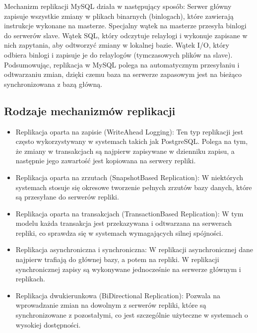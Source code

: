 \documentclass[a4paper,11pt,polish]{sphinxmanual}
\begin{document}
\sphinxAtStartPar
Mechanizm replikacji MySQL działa w następujący sposób:
\sphinxhyphen{} Serwer główny zapisuje wszystkie zmiany w plikach binarnych (bin\sphinxhyphen{}logach), które zawierają instrukcje wykonane na masterze.
\sphinxhyphen{} Specjalny wątek na masterze przesyła bin\sphinxhyphen{}logi do serwerów slave.
\sphinxhyphen{} Wątek SQL, który odczytuje relay\sphinxhyphen{}logi i wykonuje zapisane w nich zapytania, aby odtworzyć zmiany w lokalnej bazie.
\sphinxhyphen{} Wątek I/O, który odbiera bin\sphinxhyphen{}logi i zapisuje je do relay\sphinxhyphen{}logów (tymczasowych plików na slave).
Podsumowując, replikacja w MySQL polega na automatycznym przesyłaniu i odtwarzaniu zmian, dzięki czemu baza na serwerze zapasowym jest na bieżąco synchronizowana z bazą główną.


\subsection{Rodzaje mechanizmów replikacji}
\label{\detokenize{Wydajnosc-Skalowanie-i-Replikacja/index:rodzaje-mechanizmow-replikacji}}\begin{itemize}
\item {} 
\sphinxAtStartPar
Replikacja oparta na zapisie (Write\sphinxhyphen{}Ahead Logging): Ten typ replikacji jest często wykorzystywany w systemach takich jak PostgreSQL. Polega na tym, że zmiany w transakcjach są najpierw zapisywane w dzienniku zapisu, a następnie jego zawartość jest kopiowana na serwery repliki.

\item {} 
\sphinxAtStartPar
Replikacja oparta na zrzutach (Snapshot\sphinxhyphen{}Based Replication): W niektórych systemach stosuje się okresowe tworzenie pełnych zrzutów bazy danych, które są przesyłane do serwerów repliki.

\item {} 
\sphinxAtStartPar
Replikacja oparta na transakcjach (Transaction\sphinxhyphen{}Based Replication): W tym modelu każda transakcja jest przekazywana i odtwarzana na serwerach repliki, co sprawdza się w systemach wymagających silnej spójności.

\item {} 
\sphinxAtStartPar
Replikacja asynchroniczna i synchroniczna: W replikacji asynchronicznej dane najpierw trafiają do głównej bazy, a potem na repliki. W replikacji synchronicznej zapisy są wykonywane jednocześnie na serwerze głównym i replikach.

\item {} 
\sphinxAtStartPar
Replikacja dwukierunkowa (Bi\sphinxhyphen{}Directional Replication): Pozwala na wprowadzanie zmian na dowolnym z serwerów repliki, które są synchronizowane z pozostałymi, co jest szczególnie użyteczne w systemach o wysokiej dostępności.

\end{itemize}
\end{document}
